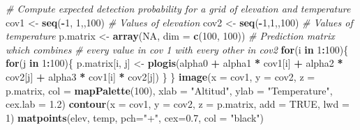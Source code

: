 \documentclass[
]{book}
\newenvironment{Shaded}{\begin{snugshade}}{\end{snugshade}}
\newcommand{\CommentTok}[1]{\textcolor[rgb]{0.56,0.35,0.01}{\textit{#1}}}
\newcommand{\ControlFlowTok}[1]{\textcolor[rgb]{0.13,0.29,0.53}{\textbf{#1}}}
\newcommand{\DataTypeTok}[1]{\textcolor[rgb]{0.13,0.29,0.53}{#1}}
\newcommand{\DecValTok}[1]{\textcolor[rgb]{0.00,0.00,0.81}{#1}}
\newcommand{\FloatTok}[1]{\textcolor[rgb]{0.00,0.00,0.81}{#1}}
\newcommand{\KeywordTok}[1]{\textcolor[rgb]{0.13,0.29,0.53}{\textbf{#1}}}
\newcommand{\NormalTok}[1]{#1}
\newcommand{\OperatorTok}[1]{\textcolor[rgb]{0.81,0.36,0.00}{\textbf{#1}}}
\newcommand{\OtherTok}[1]{\textcolor[rgb]{0.56,0.35,0.01}{#1}}
\newcommand{\StringTok}[1]{\textcolor[rgb]{0.31,0.60,0.02}{#1}}
\begin{document}
\begin{Shaded}
\begin{Highlighting}[]
\CommentTok{# Compute expected detection probability for a grid of elevation and temperature}
\NormalTok{cov1 <-}\StringTok{ }\KeywordTok{seq}\NormalTok{(}\OperatorTok{-}\DecValTok{1}\NormalTok{, }\DecValTok{1}\NormalTok{,,}\DecValTok{100}\NormalTok{)                  }\CommentTok{# Values of elevation}
\NormalTok{cov2 <-}\StringTok{ }\KeywordTok{seq}\NormalTok{(}\OperatorTok{-}\DecValTok{1}\NormalTok{,}\DecValTok{1}\NormalTok{,,}\DecValTok{100}\NormalTok{)                   }\CommentTok{# Values of temperature}
\NormalTok{p.matrix <-}\StringTok{ }\KeywordTok{array}\NormalTok{(}\OtherTok{NA}\NormalTok{, }\DataTypeTok{dim =} \KeywordTok{c}\NormalTok{(}\DecValTok{100}\NormalTok{, }\DecValTok{100}\NormalTok{)) }\CommentTok{# Prediction matrix which combines }
\CommentTok{# every value in cov 1 with every other in cov2}
\ControlFlowTok{for}\NormalTok{(i }\ControlFlowTok{in} \DecValTok{1}\OperatorTok{:}\DecValTok{100}\NormalTok{)\{}
   \ControlFlowTok{for}\NormalTok{(j }\ControlFlowTok{in} \DecValTok{1}\OperatorTok{:}\DecValTok{100}\NormalTok{)\{}
\NormalTok{      p.matrix[i, j] <-}\StringTok{ }\KeywordTok{plogis}\NormalTok{(alpha0 }\OperatorTok{+}\StringTok{ }\NormalTok{alpha1 }\OperatorTok{*}\StringTok{ }\NormalTok{cov1[i] }\OperatorTok{+}\StringTok{ }
\StringTok{                                 }\NormalTok{alpha2 }\OperatorTok{*}\StringTok{ }\NormalTok{cov2[j] }\OperatorTok{+}\StringTok{ }
\StringTok{                                 }\NormalTok{alpha3 }\OperatorTok{*}\StringTok{ }\NormalTok{cov1[i] }\OperatorTok{*}\StringTok{ }\NormalTok{cov2[j])}
\NormalTok{   \}}
\NormalTok{\}}
\KeywordTok{image}\NormalTok{(}\DataTypeTok{x =}\NormalTok{ cov1, }\DataTypeTok{y =}\NormalTok{ cov2, }\DataTypeTok{z =}\NormalTok{ p.matrix, }\DataTypeTok{col =} \KeywordTok{mapPalette}\NormalTok{(}\DecValTok{100}\NormalTok{), }\DataTypeTok{xlab =} \StringTok{"Altitud"}\NormalTok{, }
      \DataTypeTok{ylab =} \StringTok{"Temperature"}\NormalTok{, }\DataTypeTok{cex.lab =} \FloatTok{1.2}\NormalTok{)}
\KeywordTok{contour}\NormalTok{(}\DataTypeTok{x =}\NormalTok{ cov1, }\DataTypeTok{y =}\NormalTok{ cov2, }\DataTypeTok{z =}\NormalTok{ p.matrix, }\DataTypeTok{add =} \OtherTok{TRUE}\NormalTok{, }\DataTypeTok{lwd =} \DecValTok{1}\NormalTok{)}
\KeywordTok{matpoints}\NormalTok{(elev, temp, }\DataTypeTok{pch=}\StringTok{"+"}\NormalTok{, }\DataTypeTok{cex=}\FloatTok{0.7}\NormalTok{, }\DataTypeTok{col =} \StringTok{"black"}\NormalTok{)}
\end{Highlighting}
\end{Shaded}
\end{document}
